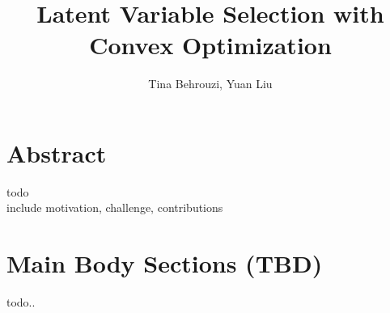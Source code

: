 \documentclass[10pt,conference]{IEEEtran}
\begin{document}
\title{Latent Variable Selection with Convex Optimization}
\author{Tina Behrouzi, Yuan Liu}


\maketitle

\section*{Abstract}
todo\\
include motivation, challenge, contributions\\
\vfill\null

\section*{Main Body Sections (TBD)}
todo..\\
\vfill\null
\end{document}
